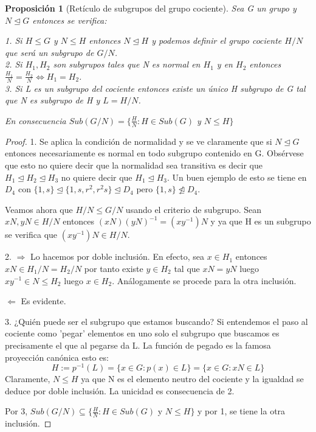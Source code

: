\documentclass{article}
\theoremstyle{theorem-style}  %
\newtheorem{proposition}[theorem]{Proposición}
\theoremstyle{definition-style}
\theoremstyle{example-style}
\begin{document}
\begin{proposition}[Retículo de subgrupos del grupo cociente]
Sea G un grupo y $N \unlhd G$ entonces se verifica:

1. Si $H \le G$ y $N \le H$ entonces $N \unlhd H$ y podemos definir el grupo cociente $H/N$ que será un subgrupo de $G/N$.\\
2. Si $H_1,H_2$ son subgrupos tales que N es normal en $H_1$ y en $H_2$ entonces $\frac{H_1}{N} = \frac{H_2}{N} \iff H_1 = H_2$. \\
3. Si L es un subgrupo del cociente entonces existe un único H subgrupo de G tal que N es subgrupo de H y $L = H/N$.

En consecuencia $Sub(G/N) = \{\frac{H}{N}:H \in Sub(G)$ y $N \le H\}$
\end{proposition}
\begin{proof}
1. Se aplica la condición de normalidad y se ve claramente que si $N \unlhd G$ entonces necesariamente es normal en todo subgrupo contenido en G. Obsérvese que esto no quiere decir que la normalidad sea transitiva es decir que $H_1 \unlhd H_2 \unlhd H_3$ no quiere decir que $H_1 \unlhd H_3$. Un buen ejemplo de esto se tiene en $D_4$ con $\{1,s\} \unlhd \{1,s,r^2,r^2s\} \unlhd D_4$ pero $\{1,s\} \ntrianglelefteq D_4$.

Veamos ahora que $H/N \le G/N$ usando el criterio de subgrupo. Sean $xN,yN \in H/N$ entonces $(xN)(yN)^{-1} = (xy^{-1})N$ y ya que H es un subgrupo se verifica que $(xy^{-1})N \in H/N$.

2. $\Rightarrow$ Lo hacemos por doble inclusión. En efecto, sea $x \in H_1$ entonces $xN \in H_1/N = H_2/N$ por tanto existe $y \in H_2$ tal que $xN = yN$ luego $xy^{-1} \in N \le    H_2$ luego $x \in H_2$. Análogamente se procede para la otra inclusión.

$\Leftarrow$ Es evidente.

3. ¿Quién puede ser el subgrupo que estamos buscando? Si entendemos el paso al cociente como 'pegar' elementos en uno solo el subgrupo que buscamos es precisamente el que al pegarse da L. La función de pegado es la famosa proyección canónica esto es: $$H:=p^{-1}(L) = \{x \in G : p(x) \in L\} = \{x \in G:xN \in L\}$$ Claramente, $N \le H$ ya que N es el elemento neutro del cociente y la igualdad se deduce por doble inclusión. La unicidad es consecuencia de 2.

Por 3, $Sub(G/N) \subseteq \{\frac{H}{N}:H \in Sub(G)$ y $N \le H\}$ y por 1, se tiene la otra inclusión.
\end{proof}
\end{document}
